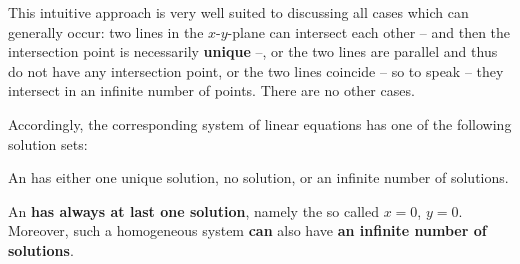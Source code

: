 \begin{MIntro}
This intuitive approach is very well suited to discussing all cases which can generally occur: two
lines in the $x$-$y$-plane can intersect each other -- and then the intersection point is 
necessarily \textbf{unique} --, or the two lines are parallel and thus do not have any
intersection point, or the two lines coincide -- so to speak -- they intersect in 
an infinite number of points. There are no other cases.

Accordingly, the corresponding system of linear equations has one of the following solution sets: 

\begin{MInfo}
An  
has either one unique solution, no solution, or an infinite number of solutions.

An   
\textbf{has always at last one solution}, namely the so called 
 $x = 0$, $y = 0$.
Moreover, such a homogeneous system \textbf{can} also have \textbf{an infinite number of solutions}.
\end{MInfo}


\end{MIntro}
